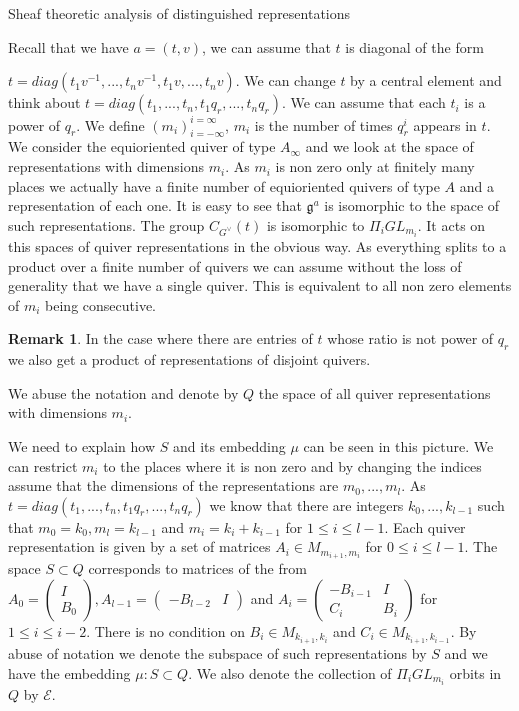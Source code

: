 \documentclass[12pt]{article}
\newcommand{\B}{\mathcal{B}}
\newcommand{\C}{\mathbb{C}}
\newcommand{\<}{\langle}
\renewcommand{\>}{\rangle}
\theoremstyle{plain}
\theoremstyle{definition}
\newtheorem{Remark}[theorem]{Remark}
\begin{document}
\begin{section}{Sheaf theoretic analysis of distinguished representations}
\begin{subsection}
Recall that we have $a=(t,v)$, we can assume that $t$ is diagonal of the form 

$t=diag(t_1v^{-1},...,t_nv^{-1},t_1v,...,t_nv)$. We can change $t$ by a central element and think about $t=diag(t_1,...,t_n,t_1q_r,...,t_nq_r)$. We can assume that each $t_i$ is a power of $q_r$. We define $(m_i)^{i=\infty}_{i=-\infty}$, $m_i$ is the number of times $q_r^i$ appears in $t$. We consider the equioriented quiver of type $A_\infty$ and we look at the space of representations with dimensions $m_i$. As $m_i$ is non zero only at finitely many places we actually have a finite number of equioriented quivers of type $A$ and a representation of each one. It is easy to see that $\mathfrak{g}^a$ is isomorphic to the space of such representations. The group $C_{G^\vee}(t)$ is isomorphic to $\Pi_{i}GL_{m_i}$. It acts on this spaces of quiver representations in the obvious way. As everything splits to a product over a finite number of quivers we can assume without the loss of generality that we have a single quiver. This is equivalent to all non zero elements of $m_i$ being consecutive.

\begin{Remark}
    In the case where there are entries of $t$ whose ratio is not power of $q_r$ we also get a product of representations of disjoint quivers.
\end{Remark}

We abuse the notation and denote by $Q$ the space of all quiver representations with dimensions $m_i$.

We need to explain how $S$ and its embedding $\mu$ can be seen in this picture. We can restrict $m_i$ to the places where it is non zero and by changing the indices assume that the dimensions of the representations are $m_0,...,m_l$. As $t=diag(t_1,...,t_n,t_1q_r,...,t_nq_r)$ we know that there are integers $k_0,...,k_{l-1}$ such that $m_0=k_0,m_l=k_{l-1}$ and $m_i=k_i+k_{i-1}$ for $1\leq i\leq l-1$. Each quiver representation is given by a set of matrices $A_i\in M_{m_{i+1},m_i}$ for $0\leq i\leq l-1$. The space $S\subset Q$ corresponds to matrices of the from $A_0=\begin{pmatrix}
    I \\B_0
\end{pmatrix}, A_{l-1}=\begin{pmatrix}
    -B_{l-2} & I
\end{pmatrix}$ and $A_i=\begin{pmatrix}
    -B_{i-1}& I\\C_i& B_i
\end{pmatrix}$ for $1\leq i\leq i-2$. There is no condition on $B_i\in M_{k_{i+1},k_i}$ and $C_i\in M_{k_{i+1},k_{i-1}}$. By abuse of notation we denote the subspace of such representations by $S$ and we have the embedding $\mu:S\subset Q$. We also denote the collection of $\Pi_{i}GL_{m_i}$ orbits in $Q$ by $\mathcal{E}$.


\end{subsection}
\end{section}
\end{document}
